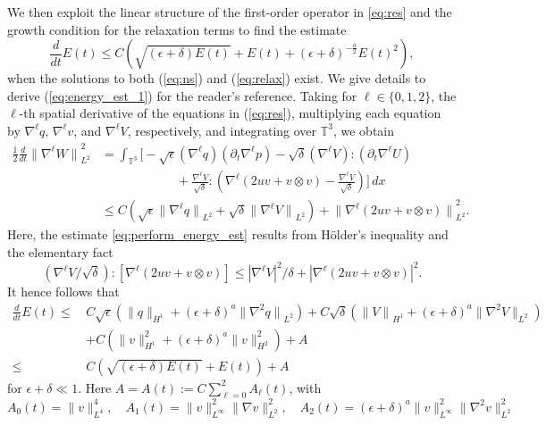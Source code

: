 \documentclass[reqno,10pt]{amsart}
\theoremstyle{definition}
\theoremstyle{remark}
\numberwithin{equation}{section}
\begin{document}
We then exploit the linear structure of the first-order operator in \eqref{eq:res} and the growth condition for the relaxation terms to find the estimate
\begin{equation} \label{eq:energy_est_1}
    \frac{d}{dt}E(t) \le C\left( \sqrt{(\epsilon+\delta)E(t)} + E(t) + (\epsilon+\delta)^{-\frac{a}{2}}E(t)^2 \right),
\end{equation}
when the solutions to both (\ref{eq:ns}) and (\ref{eq:relax}) exist. We give details to derive (\ref{eq:energy_est_1}) for the reader's reference. Taking for $\ell\in \{0,1,2\}$, the $\ell$-th spatial derivative of the equations in (\ref{eq:res}), multiplying each equation by $\nabla^\ell q$, $\nabla^\ell v$, and $\nabla^\ell V$, respectively, and integrating over $\mathbb T^3$, we obtain
\begin{equation} \label{eq:perform_energy_est}
\begin{aligned}
        \frac{1}{2}\frac{d}{dt}{\| \nabla^\ell W\|}_{L^2}^2 &= \int_{\mathbb T^3} \bigg[
        -\sqrt\epsilon (\nabla^\ell q) (\partial_t\nabla^\ell p) - \sqrt\delta (\nabla^\ell V):(\partial_t\nabla^\ell U) \\
       & \qquad \qquad \qquad + \frac{\nabla^\ell V}{\sqrt\delta}:\left( \nabla^\ell (2uv+v\otimes v) - \frac{\nabla^\ell V}{\sqrt\delta} \right) 
        \bigg] \, dx \\
        &\le C\left( \sqrt\epsilon {\| \nabla^\ell q\|}_{L^2} + \sqrt\delta {\|\nabla^\ell V\|}_{L^2} \right) + {\|\nabla^\ell (2uv+v\otimes v)\|}_{L^2}^2.
\end{aligned}
\end{equation}
Here, the estimate \eqref{eq:perform_energy_est} results from H{\"o}lder's inequality and the elementary fact 
\[
  (\nabla^\ell V/\sqrt\delta):[\nabla^\ell(2uv+v\otimes v)]\le |\nabla^\ell V|^2/\delta + |\nabla^\ell(2uv+v\otimes v)|^2.
\]
It hence follows that
\[
\begin{aligned}
    \frac{d}{dt}E(t) \le \, & C \sqrt\epsilon\left( \|q\|_{H^1} + (\epsilon+\delta)^a {\| \nabla^2 q\|}_{L^2} \right) + C\sqrt\delta\left( {\|V\|}_{H^1} + (\epsilon+\delta)^a \|\nabla^2 V\|_{L^2} \right) \\ 
    &+ C\left( \|v\|_{H^1}^2 + (\epsilon+\delta)^a \|v\|_{H^2}^2 \right) + A \\
    \le \, & C \left( \sqrt{(\epsilon+\delta)E(t)} + E(t) \right) + A
\end{aligned}
\]
for $\epsilon+\delta\ll 1$. Here $A=A(t):=C\sum_{\ell=0}^2 A_\ell(t)$, with
\begin{equation} \label{eq:As}
    A_0(t) = \|v\|_{L^4}^4, \quad A_1(t)= \|v\|_{L^\infty}^2 \|\nabla v\|_{L^2}^2, \quad
    A_2(t) = (\epsilon+\delta)^a \|v\|_{L^\infty}^2 \|\nabla^2 v\|_{L^2}^2
\end{equation}
\end{document}
